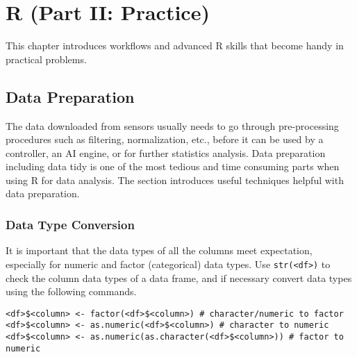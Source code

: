 \chapter{R (Part II: Practice)} \label{ch:r2}

This chapter introduces workflows and advanced R skills that become handy in practical problems.

\section{Data Preparation} \label{ch:r2:sec:datapreparation}

The data downloaded from sensors usually needs to go through pre-processing procedures such as filtering, normalization, etc., before it can be used by a controller, an AI engine, or for further statistics analysis. Data preparation including data tidy is one of the most tedious and time consuming parts when using R for data analysis. The section introduces useful techniques helpful with data preparation.

\subsection{Data Type Conversion}

It is important that the data types of all the columns meet expectation, especially for numeric and factor (categorical) data types. Use \verb|str(<df>)| to check the column data types of a data frame, and if necessary convert data types using the following commands.
\begin{lstlisting}
<df>$<column> <- factor(<df>$<column>) # character/numeric to factor
<df>$<column> <- as.numeric(<df>$<column>) # character to numeric
<df>$<column> <- as.numeric(as.character(<df>$<column>)) # factor to numeric
\end{lstlisting}

